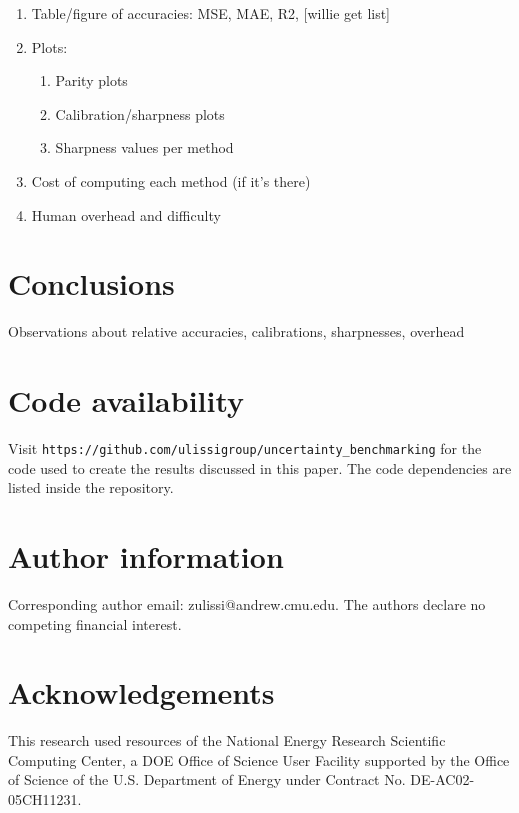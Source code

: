 \documentclass[]{achemso}
\begin{document}
\begin{enumerate}
    \item{Table/figure of accuracies: MSE, MAE, R2, [willie get list]}
    \item{Plots:}
        \begin{enumerate}
            \item{Parity plots}
            \item{Calibration/sharpness plots}
            \item{Sharpness values per method}
        \end{enumerate}
    \item{Cost of computing each method (if it’s there)}
    \item{Human overhead and difficulty}
\end{enumerate}



\section{Conclusions}

Observations about relative accuracies, calibrations, sharpnesses, overhead



\section*{Code availability} Visit \texttt{https://github.com/ulissigroup/uncertainty\_benchmarking} for the code used to create the results discussed in this paper.
The code dependencies are listed inside the repository.

\section*{Author information} Corresponding author email:  zulissi@andrew.cmu.edu.
The authors declare no competing financial interest.

\section*{Acknowledgements} This research used resources of the National Energy Research Scientific Computing Center, a DOE Office of Science User Facility supported by the Office of Science of the U.S. Department of Energy under Contract No. DE-AC02-05CH11231. %



\clearpage

\end{document}
